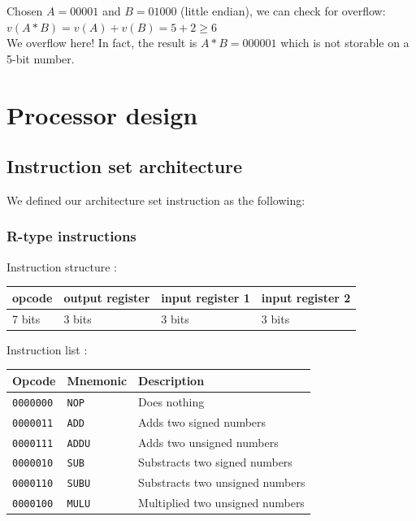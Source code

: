 \documentclass[a4paper]{report}
\begin{document}
Chosen $A=00001$ and $B=01000$ (little endian), we can check for overflow: $v(A*B)=v(A)+v(B)=5 + 2 \geq 6$ \\
We overflow here! In fact, the result is $A*B=000001$ which is not storable on a 5-bit number.

\section{Processor design}

\subsection{Instruction set architecture}

We defined our architecture set instruction as the following:

\subsubsection{R-type instructions}

Instruction structure :

\begin{center}
	\begin{tabular}{|l|l|l|l|}
		\hline
		opcode & output register & input register 1 & input register 2 \\
		\hline
		7 bits & 3 bits & 3 bits & 3 bits \\
		\hline
	\end{tabular}
\end{center}

Instruction list :

\begin{center}
	\begin{tabular}{|l|l|l|}
		\hline
		Opcode & Mnemonic & Description \\
		\hline \hline
		\texttt{0000000} & \texttt{NOP} &  Does nothing \\
		\texttt{0000011} & \texttt{ADD} &  Adds two signed numbers \\
		\texttt{0000111} & \texttt{ADDU} & Adds two unsigned numbers \\
		\texttt{0000010} & \texttt{SUB} &  Substracts two signed numbers \\
		\texttt{0000110} & \texttt{SUBU} & Substracts two unsigned numbers \\
		\texttt{0000100} & \texttt{MULU} & Multiplied two unsigned numbers \\
		\hline
	\end{tabular}
\end{center}
\end{document}
